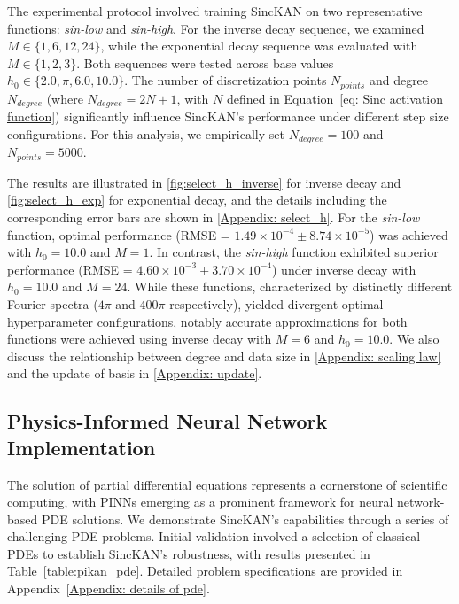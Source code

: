 The experimental protocol involved training SincKAN on two representative functions: \textit{sin-low} and \textit{sin-high}. For the inverse decay sequence, we examined $M \in \{1,6,12,24\}$, while the exponential decay sequence was evaluated with $M \in \{1,2,3\}$. Both sequences were tested across base values $h_0 \in \{2.0, \pi, 6.0, 10.0\}$. The number of discretization points $N_{points}$ and degree $N_{degree}$ (where $N_{degree}=2N+1$, with $N$ defined in Equation~\ref{eq: Sinc activation function}) significantly influence SincKAN's performance under different step size configurations. For this analysis, we empirically set $N_{degree}=100$ and $N_{points}=5000$.

The results are illustrated in \cref{fig:select_h_inverse} for inverse decay and \cref{fig:select_h_exp} for exponential decay, and the details including the corresponding error bars are shown in \cref{Appendix: select_h}. For the \textit{sin-low} function, optimal performance (RMSE = $1.49 \times 10^{-4} \pm 8.74 \times 10^{-5}$) was achieved with $h_0=10.0$ and $M=1$. In contrast, the \textit{sin-high} function exhibited superior performance (RMSE = $4.60 \times 10^{-3} \pm 3.70 \times 10^{-4}$) under inverse decay with $h_0=10.0$ and $M=24$. While these functions, characterized by distinctly different Fourier spectra ($4\pi$ and $400\pi$ respectively), yielded divergent optimal hyperparameter configurations, notably accurate approximations for both functions were achieved using inverse decay with $M=6$ and $h_0=10.0$. We also discuss the relationship between degree and data size in \cref{Appendix: scaling law} and the update of basis in \cref{Appendix: update}.

\subsection{Physics-Informed Neural Network Implementation}
The solution of partial differential equations represents a cornerstone of scientific computing, with PINNs emerging as a prominent framework for neural network-based PDE solutions. We demonstrate SincKAN's capabilities through a series of challenging PDE problems. Initial validation involved a selection of classical PDEs to establish SincKAN's robustness, with results presented in Table~\ref{table:pikan_pde}. Detailed problem specifications are provided in Appendix~\ref{Appendix: details of pde}.

